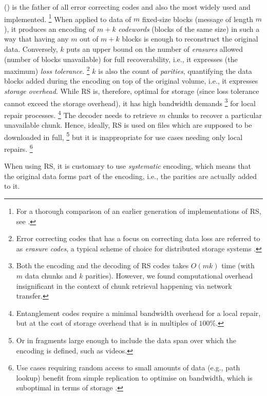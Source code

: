  () \citep{lubyetal1995CRS,plank2006optimizing,li2013erasure} 
is the father of all  error correcting codes and also the most widely used and implemented.%
%
\footnote{%
For a thorough comparison of an earlier generation of implementations of RS, see \citet{plank2009performance}.}
% 
When applied to data of $m$ fixed-size blocks (message of length $m$), it produces an encoding of $m+k$ \emph{codewords} (blocks of the same size) 
in such a way that having any $m$ out of $m+k$ blocks is enough to reconstruct the original data. Conversely, $k$ puts an upper bound on the number of \emph{erasures} allowed (number of blocks unavailable) for full recoverability, i.e., it expresses (the maximum) \emph{loss tolerance}.%
%
\footnote{Error correcting codes that has a focus on correcting data loss are referred to as \emph{erasure codes}, a typical scheme of choice for distributed storage systems \citep{balaji2018erasure}.}
%
$k$ is also the count of \emph{parities}, quantifying the data blocks added during the encoding on top of the original volume, i.e., it expresses \emph{storage overhead}. While RS is, therefore, optimal for storage (since loss tolerance cannot exceed the storage overhead), 
it has high bandwidth demands%
%
\footnote{Both the encoding and the decoding of RS codes takes $O(mk)$ time (with $m$ data chunks and $k$ parities). However, we found computational overhead insignificant in the context of chunk retrieval happening via network transfer.}
%
for local repair processes.%
%
\footnote{Entanglement codes \citep{estrada2018alpha, estrada2019building} require a minimal bandwidth overhead for a local repair, but at the cost of storage overhead that is in multiples of $100\%$.}
%
The decoder needs to retrieve $m$ chunks to recover a particular unavailable chunk. 
Hence, ideally, RS is used on files which are supposed to be downloaded in full,%
%
\footnote{Or in  fragments large enough  to include the data span over which the encoding is defined, such as videos.}
%
 but it is inappropriate for use cases needing only local repairs.%
%
\footnote{Use cases requiring random access to small amounts of data (e.g., path lookup) benefit from simple replication to optimise on bandwidth, which is suboptimal in terms of storage \citep{weatherspoon2002erasure}.}

When using RS, it is customary to use \emph{systematic} encoding, which means that the original data forms part of the encoding, i.e., the parities are actually added to it.%
%
%
% 
%


